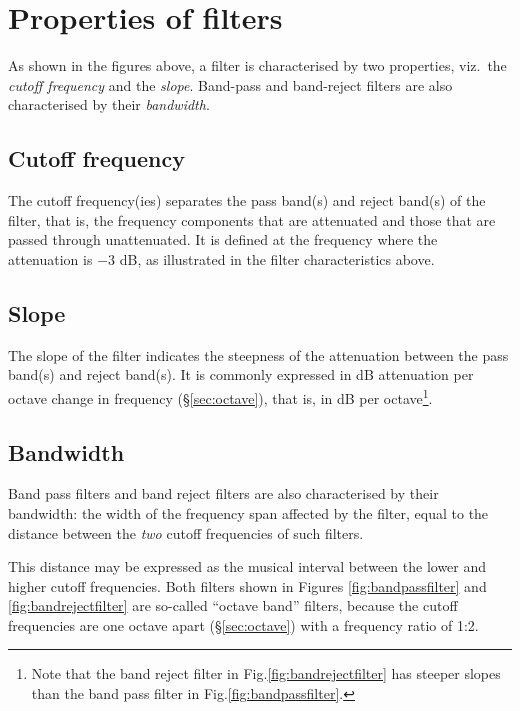 \documentclass[
]{book}
\begin{document}
\section{Properties of filters}\label{properties-of-filters}

As shown in the figures above, a filter is characterised by two properties, viz.~the \emph{cutoff frequency} and the \emph{slope}. Band-pass and band-reject filters are also characterised by their \emph{bandwidth}.

\subsection{Cutoff frequency}\label{cutoff-frequency}

The cutoff frequency(ies) separates the pass band(s) and reject band(s) of the filter, that is, the frequency components that are attenuated and those that are passed through unattenuated. It is defined at the frequency where the attenuation is \(-3\) dB, as illustrated in the filter characteristics above.

\subsection{Slope}\label{slope}

The slope of the filter indicates the steepness of the attenuation between the pass band(s) and reject band(s). It is commonly expressed in dB attenuation per octave change in frequency (§\ref{sec:octave}), that is, in dB per octave\footnote{Note that the band reject filter in Fig.\ref{fig:bandrejectfilter} has steeper slopes than the band pass filter in Fig.\ref{fig:bandpassfilter}.}.

\subsection{Bandwidth}\label{sec:filterbandwidth}

Band pass filters and band reject filters are also characterised by their bandwidth: the width of the frequency span affected by the filter, equal to the distance between the \emph{two} cutoff frequencies of such filters.

This distance may be expressed as the musical interval between the lower and higher cutoff frequencies. Both filters shown in Figures \ref{fig:bandpassfilter} and \ref{fig:bandrejectfilter} are so-called ``octave band'' filters, because the cutoff frequencies are one octave apart (§\ref{sec:octave}) with a frequency ratio of 1:2.
\end{document}
